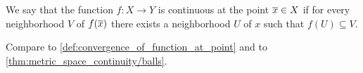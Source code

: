 \begin{definition}\label{def:continuous_function_at_point}
  We say that the function \( f: X \to Y \) is continuous at the point \( \overline{x} \in X \) if for every neighborhood \( V \) of \( f(\overline{x}) \) there exists a neighborhood \( U \) of \( x \) such that \( f(U) \subseteq V \).

  Compare to \cref{def:convergence_of_function_at_point} and to \cref{thm:metric_space_continuity/balls}.
\end{definition}
